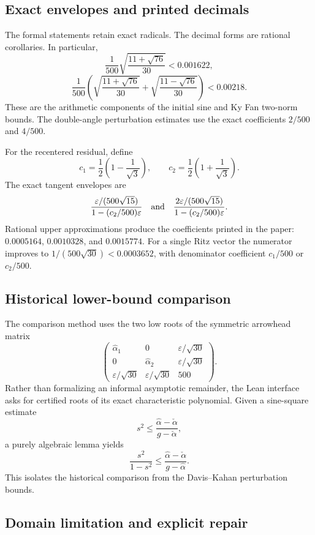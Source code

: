 \subsection{Exact envelopes and printed decimals}

The formal statements retain exact radicals.  The decimal forms are rational
corollaries.  In particular,
\[
 \frac{1}{500}\sqrt{\frac{11+\sqrt{76}}{30}}<0.001622,
\]
\[
 \frac{1}{500}\left(
 \sqrt{\frac{11+\sqrt{76}}{30}}+
 \sqrt{\frac{11-\sqrt{76}}{30}}\right)<0.00218.
\]
These are the arithmetic components of the initial sine and Ky Fan two-norm
bounds.  The double-angle perturbation estimates use the exact coefficients
$2/500$ and $4/500$.

For the recentered residual, define
\[
 c_1=\frac12\left(1-\frac1{\sqrt3}\right),\qquad
 c_2=\frac12\left(1+\frac1{\sqrt3}\right).
\]
The exact tangent envelopes are
\[
 \frac{\varepsilon/(500\sqrt{15})}{1-(c_2/500)\varepsilon}
 \quad\hbox{and}\quad
 \frac{2\varepsilon/(500\sqrt{15})}{1-(c_2/500)\varepsilon}.
\]
Rational upper approximations produce the coefficients printed in the paper:
$0.0005164$, $0.0010328$, and $0.0015774$.
For a single Ritz vector the numerator improves to
$1/(500\sqrt{30})<0.0003652$, with denominator coefficient $c_1/500$ or
$c_2/500$.

\subsection{Historical lower-bound comparison}

The comparison method uses the two low roots of the symmetric arrowhead matrix
\[
 \begin{pmatrix}
 \widehat\alpha_1&0&\varepsilon/\sqrt{30}\\
 0&\widehat\alpha_2&\varepsilon/\sqrt{30}\\
 \varepsilon/\sqrt{30}&\varepsilon/\sqrt{30}&500
 \end{pmatrix}.
\]
Rather than formalizing an informal asymptotic remainder, the Lean interface
asks for certified roots of its exact characteristic polynomial.  Given a
sine-square estimate
\[
 s^2\leq\frac{\widehat\alpha-\check\alpha}
 {g-\check\alpha},
\]
a purely algebraic lemma yields
\[
 \frac{s^2}{1-s^2}\leq
 \frac{\widehat\alpha-\check\alpha}{g-\widehat\alpha}.
\]
This isolates the historical comparison from the Davis--Kahan perturbation
bounds.

\subsection{Domain limitation and explicit repair}

